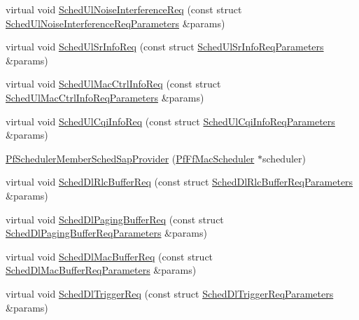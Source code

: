 \begin{DoxyCompactItemize}
virtual void \hyperlink{classns3_1_1PfSchedulerMemberSchedSapProvider_ab12bcf448c9af8d6bc58180f6d9c5cad}{Sched\+Ul\+Noise\+Interference\+Req} (const struct \hyperlink{structns3_1_1FfMacSchedSapProvider_1_1SchedUlNoiseInterferenceReqParameters}{Sched\+Ul\+Noise\+Interference\+Req\+Parameters} \&params)
\item 
virtual void \hyperlink{classns3_1_1PfSchedulerMemberSchedSapProvider_a83bac2ec7458edf97fb0a25079f09054}{Sched\+Ul\+Sr\+Info\+Req} (const struct \hyperlink{structns3_1_1FfMacSchedSapProvider_1_1SchedUlSrInfoReqParameters}{Sched\+Ul\+Sr\+Info\+Req\+Parameters} \&params)
\item 
virtual void \hyperlink{classns3_1_1PfSchedulerMemberSchedSapProvider_a4a0cf091c5b6e74a5143c3bb4f97af1b}{Sched\+Ul\+Mac\+Ctrl\+Info\+Req} (const struct \hyperlink{structns3_1_1FfMacSchedSapProvider_1_1SchedUlMacCtrlInfoReqParameters}{Sched\+Ul\+Mac\+Ctrl\+Info\+Req\+Parameters} \&params)
\item 
virtual void \hyperlink{classns3_1_1PfSchedulerMemberSchedSapProvider_a1b9037edf29cfeaa8eacd934a9545235}{Sched\+Ul\+Cqi\+Info\+Req} (const struct \hyperlink{structns3_1_1FfMacSchedSapProvider_1_1SchedUlCqiInfoReqParameters}{Sched\+Ul\+Cqi\+Info\+Req\+Parameters} \&params)
\item 
\hyperlink{classns3_1_1PfSchedulerMemberSchedSapProvider_a242c88e8c3713f6782a3f3dd67bf0523}{Pf\+Scheduler\+Member\+Sched\+Sap\+Provider} (\hyperlink{classns3_1_1PfFfMacScheduler}{Pf\+Ff\+Mac\+Scheduler} $\ast$scheduler)
\item 
virtual void \hyperlink{classns3_1_1PfSchedulerMemberSchedSapProvider_a651417355178222683fb29e2f26383d7}{Sched\+Dl\+Rlc\+Buffer\+Req} (const struct \hyperlink{structns3_1_1FfMacSchedSapProvider_1_1SchedDlRlcBufferReqParameters}{Sched\+Dl\+Rlc\+Buffer\+Req\+Parameters} \&params)
\item 
virtual void \hyperlink{classns3_1_1PfSchedulerMemberSchedSapProvider_a92e1cbed4cf4d3a2012e19787b7a7856}{Sched\+Dl\+Paging\+Buffer\+Req} (const struct \hyperlink{structns3_1_1FfMacSchedSapProvider_1_1SchedDlPagingBufferReqParameters}{Sched\+Dl\+Paging\+Buffer\+Req\+Parameters} \&params)
\item 
virtual void \hyperlink{classns3_1_1PfSchedulerMemberSchedSapProvider_aacda341bb7ddca082737d0b9a9d7aaf9}{Sched\+Dl\+Mac\+Buffer\+Req} (const struct \hyperlink{structns3_1_1FfMacSchedSapProvider_1_1SchedDlMacBufferReqParameters}{Sched\+Dl\+Mac\+Buffer\+Req\+Parameters} \&params)
\item 
virtual void \hyperlink{classns3_1_1PfSchedulerMemberSchedSapProvider_ad05790e83d5dc527ddbdb57fc83e2e08}{Sched\+Dl\+Trigger\+Req} (const struct \hyperlink{structns3_1_1FfMacSchedSapProvider_1_1SchedDlTriggerReqParameters}{Sched\+Dl\+Trigger\+Req\+Parameters} \&params)

\end{DoxyCompactItemize}
